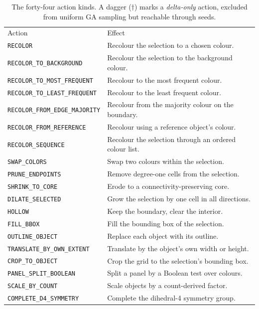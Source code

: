\begin{table}[htbp]
\centering
\caption{The forty-four action kinds. A dagger ($\dagger$) marks a \emph{delta-only}
action, excluded from uniform GA sampling but reachable through seeds.}
\label{tab:app-actions}
\footnotesize
\begin{tabular}{p{6.9cm}p{6.1cm}}
\hline\noalign{\smallskip}
Action & Effect \\
\noalign{\smallskip}\hline\noalign{\smallskip}
\texttt{RECOLOR} & Recolour the selection to a chosen colour. \\
\texttt{RECOLOR\_TO\_BACKGROUND} & Recolour the selection to the background colour. \\
\texttt{RECOLOR\_TO\_MOST\_FREQUENT} & Recolour to the most frequent colour. \\
\texttt{RECOLOR\_TO\_LEAST\_FREQUENT} & Recolour to the least frequent colour. \\
\texttt{RECOLOR\_FROM\_EDGE\_MAJORITY} & Recolour from the majority colour on the boundary. \\
\texttt{RECOLOR\_FROM\_REFERENCE} & Recolour using a reference object's colour. \\
\texttt{RECOLOR\_SEQUENCE} & Recolour the selection through an ordered colour list. \\
\texttt{SWAP\_COLORS} & Swap two colours within the selection. \\
\texttt{PRUNE\_ENDPOINTS} & Remove degree-one cells from the selection. \\
\texttt{SHRINK\_TO\_CORE} & Erode to a connectivity-preserving core. \\
\texttt{DILATE\_SELECTED} & Grow the selection by one cell in all directions. \\
\texttt{HOLLOW} & Keep the boundary, clear the interior. \\
\texttt{FILL\_BBOX} & Fill the bounding box of the selection. \\
\texttt{OUTLINE\_OBJECT} & Replace each object with its outline. \\
\texttt{TRANSLATE\_BY\_OWN\_EXTENT} & Translate by the object's own width or height. \\
\texttt{CROP\_TO\_OBJECT} & Crop the grid to the selection's bounding box. \\
\texttt{PANEL\_SPLIT\_BOOLEAN} & Split a panel by a Boolean test over colours. \\
\texttt{SCALE\_BY\_COUNT} & Scale objects by a count-derived factor. \\
\texttt{COMPLETE\_D4\_SYMMETRY} & Complete the dihedral-4 symmetry group. \\

\end{tabular}
\end{table}

